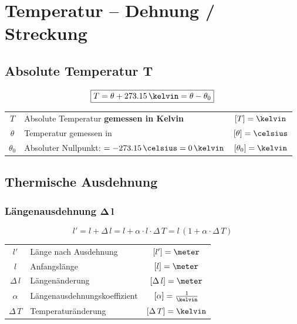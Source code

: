 \section{Temperatur -- Dehnung / Streckung}

\subsection[Absolute Temperatur]{Absolute Temperatur $\bm{T}$}

\vspace{-0.2cm}

$$ \boxed{ T = \theta + 273.15 \, \kelvin = \theta - \theta_0 } $$

\begin{tabular}{c l c}
		$T$ 		& Absolute Temperatur \textbf{gemessen in Kelvin}				& $[T] =\kelvin$  		\\
		$\theta$ 	& Temperatur gemessen in \celsius 								& $[\theta] = \celsius$ \\
		$\theta_0$ 	& Absoluter Nullpunkt: $= -273.15 \, \celsius = 0 \, \kelvin$	& $[\theta_0] = \kelvin$
\end{tabular}


\subsection{Thermische Ausdehnung}

\subsubsection{Längenausdehnung $\bm{\Delta \, l}$}

\vspace{-0.2cm}

$$ \boxed{ l' = l + \Delta \, l = l + \alpha \cdot l \cdot \Delta \, T = l \, (1 + \alpha \cdot \Delta \, T ) } $$


\begin{tabular}{c l c}
		$l'$ 			& Länge nach Ausdehnung 		& $[l'] = \meter$ 					\\
		$l$ 			& Anfangslänge 					& $[l] = \meter$ 					\\
		$\Delta \, l$ 	& Längenänderung 				& $[\Delta \, l] = \meter$ 			\\
		$\alpha$ 		& Längenausdehnungskoeffizient 	& $[\alpha] = \frac{1}{\kelvin}$ 	\\ 
		$\Delta \, T $ 	& Temperaturänderung 			& $[\Delta \, T ] = \kelvin$
\end{tabular}


